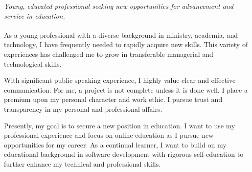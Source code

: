 
\vspace{-1.3em} %

\begin{multicols}{2}  %
\noindent \textit{Young, educated professional seeking new opportunities for advancement and service in education.}\\\\

As a young professional with a diverse background in ministry, academia, and technology, I have frequently needed to rapidly acquire new skills. This variety of experiences has challenged me to grow in transferable managerial and technological skills.

With significant public speaking experience, I highly value clear and effective communication. For me, a project is not complete unless it is done well. I place a premium upon my personal character and work ethic. I pursue trust and transparency in my personal and professional affairs.

Presently, my goal is to secure a new position in education. I want to use my professional experience and focus on online education as I pursue new opportunities for my career. As a continual learner, I want to build on my educational background in software development with rigorous self-education to further enhance my technical and professional skills.

\end{multicols}

